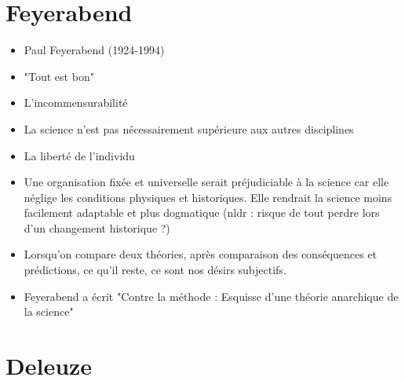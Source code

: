 \documentclass[fleqn,letterpaper, 12pt]{article}
\begin{document}
	
	\section{Feyerabend}
	
	\begin{itemize}
		\item Paul Feyerabend (1924-1994)
		\item "Tout est bon"
		\item L'incommensurabilité
		\item La science n'est pas nécessairement supérieure aux autres disciplines
		\item La liberté de l'individu
		\item Une organisation fixée et universelle serait préjudiciable à la science car elle néglige les conditions physiques et historiques. Elle rendrait la science moins facilement adaptable et plus dogmatique (nldr : risque de tout perdre lors d'un changement historique ?)
		\item Lorsqu'on compare deux théories, après comparaison des conséquences et prédictions, ce qu'il reste, ce sont nos désirs subjectifs.
		\item Feyerabend a écrit "Contre la méthode : Esquisse d'une théorie anarchique de la science"
	\end{itemize}
	
	
	
	\section{Deleuze}
	
	
	
	
	
	


	
	
	
	
\end{document}
